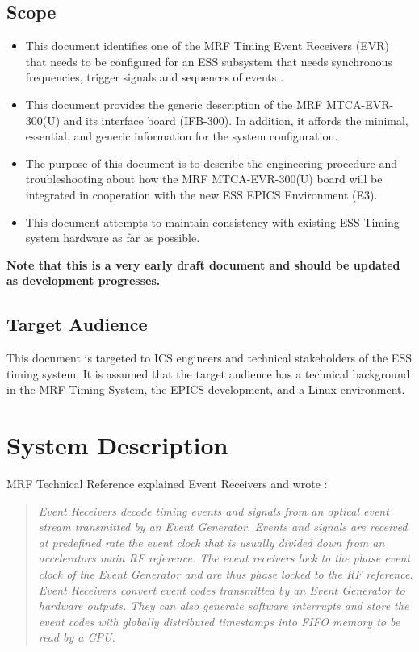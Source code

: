 \documentclass[11pt
  , a4paper
  , article
  , oneside
  , showtrims
]{memoir}
\begin{document}
\section{Scope}
\begin{itemize}
\item This document identifies one of the MRF Timing Event Receivers (EVR) that needs to be configured for an ESS subsystem that needs synchronous frequencies, trigger signals and sequences of events \cite{MRFEVENTSYSTEMDC}.
\item This document provides the generic description of the MRF MTCA-EVR-300(U) and its interface board (IFB-300). In addition, it affords the minimal, essential, and generic information for the system configuration.
\item The purpose of this document is to describe the engineering procedure and troubleshooting about how the MRF MTCA-EVR-300(U) board will be integrated in cooperation with the new ESS EPICS Environment (E3).
\item This document attempts to maintain consistency with existing ESS Timing system hardware as far as possible.
\end{itemize}
\textbf{Note that this is a very early draft document and should be updated as development progresses.}


\section{Target Audience}
This document is targeted to ICS engineers and technical stakeholders of the ESS timing system. It is assumed that the target audience has a technical background in the MRF Timing System, the EPICS development, and a Linux environment.



\chapter{System Description}
MRF Technical Reference \citep[see][p45]{MRFEVENTSYSTEMDC} explained Event Receivers and wrote :
\blockquote{\textit{Event Receivers decode timing events and signals from an optical event stream transmitted by an Event Generator. Events and signals are received at predefined rate the event clock that is usually divided down from an accelerators main RF reference. The event receivers lock to the phase event clock of the Event Generator and are thus phase locked to the RF reference. Event Receivers convert event codes transmitted by an Event Generator to hardware outputs. They can also generate software interrupts and store the event codes with globally distributed timestamps into FIFO memory to be read by a CPU.}}
\end{document}
